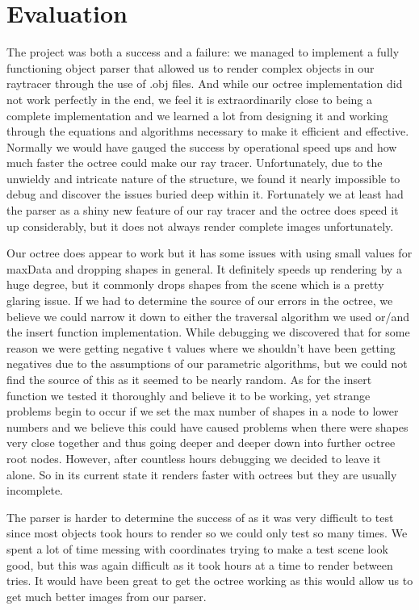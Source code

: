 \section{Evaluation}

\par The project was both a success and a failure: we managed to implement a fully functioning object parser that allowed us to render complex objects in our raytracer through the use of .obj files. And while our octree implementation did not work perfectly in the end, we feel it is extraordinarily close to being a complete implementation and we learned a lot from designing it and working through the equations and algorithms necessary to make it efficient and effective. Normally we would have gauged the success by operational speed ups and how much faster the octree could make our ray tracer. Unfortunately, due to the unwieldy and intricate nature of the structure, we found it nearly impossible to debug and discover the issues buried deep within it. Fortunately we at least had the parser as a shiny new feature of our ray tracer and the octree does speed it up considerably, but it does not always render complete images unfortunately.
\par Our octree does appear to work but it has some issues with using small values for maxData and dropping shapes in general. It definitely speeds up rendering by a huge degree, but it commonly drops shapes from the scene which is a pretty glaring issue. If we had to determine the source of our errors in the octree, we believe we could narrow it down to either the traversal algorithm we used or/and the insert function implementation. While debugging we discovered that for some reason we were getting negative t values where we shouldn't have been getting negatives due to the assumptions of our parametric algorithms, but we could not find the source of this as it seemed to be nearly random. As for the insert function we tested it thoroughly and believe it to be working, yet strange problems begin to occur if we set the max number of shapes in a node to lower numbers and we believe this could have caused problems when there were shapes very close together and thus going deeper and deeper down into further octree root nodes. However, after countless hours debugging we decided to leave it alone. So in its current state it renders faster with octrees but they are usually incomplete.
\par The parser is harder to determine the success of as it was very difficult to test since most objects took hours to render so we could only test so many times. We spent a lot of time messing with coordinates trying to make a test scene look good, but this was again difficult as it took hours at a time to render between tries. It would have been great to get the octree working as this would allow us to get much better images from our parser.




